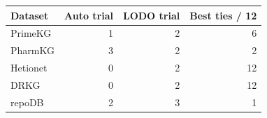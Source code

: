 \begin{tabular}{lrrr}
\toprule
Dataset & Auto trial & LODO trial & Best ties / 12 \\
\midrule
PrimeKG & 1 & 2 & 6 \\
PharmKG & 3 & 2 & 2 \\
Hetionet & 0 & 2 & 12 \\
DRKG & 0 & 2 & 12 \\
repoDB & 2 & 3 & 1 \\
\bottomrule
\end{tabular}
